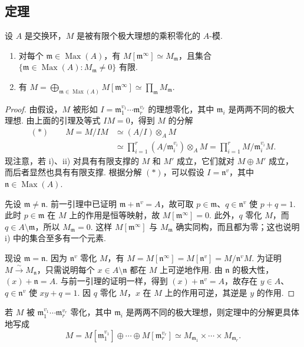 \subsection{定理}\label{sec:galois-1-9-2}
\begin{theorem*}
设 $A$ 是交换环，$M$ 是被有限个极大理想的乘积零化的 $A$-模.
\begin{enumerate}[label=\roman*)]
\item 对每个 $\mathfrak m\in\operatorname{Max}(A)$，有 $M[\mathfrak m^\infty]\simeq M_{\mathfrak m}$，且集合 $\{\mathfrak m\in\operatorname{Max}(A):M_{\mathfrak m}\ne0\}$ 有限.
\item 有 $M=\bigoplus_{\mathfrak m\in\operatorname{Max}(A)}M[\mathfrak m^\infty]\simeq\prod_{\mathfrak m}M_{\mathfrak m}$.
\end{enumerate}
\end{theorem*}
\begin{proof}
由假设，$M$ 被形如 $I=\mathfrak m_1^{v_1}\cdots\mathfrak m_r^{v_r}$ 的理想零化，其中 $\mathfrak m_i$ 是两两不同的极大理想. 由上面的引理及等式 $IM=0$，得到 $M$ 的分解
\begin{align*}
(*)\qquad M=M/IM&\simeq(A/I)\otimes_A M\\
&\simeq\prod_{i=1}^r(A/\mathfrak m_i^{v_i})\otimes_A M
=\prod_{i=1}^r M/\mathfrak m_i^{v_i}M.
\end{align*}
现注意，若 i)、ii) 对具有有限支撑的 $M$ 和 $M'$ 成立，它们就对 $M\oplus M'$ 成立，而后者显然也具有有限支撑. 根据分解 $(*)$，可以假设 $I=\mathfrak n^v$，其中 $\mathfrak n\in\operatorname{Max}(A)$.

先设 $\mathfrak m\ne\mathfrak n$. 前一引理中已证明 $\mathfrak m+\mathfrak n^v=A$，故可取 $p\in\mathfrak m$、$q\in\mathfrak n^v$ 使 $p+q=1$. 此时 $p\in\mathfrak m$ 在 $M$ 上的作用是恒等映射，故 $M[\mathfrak m^\infty]=0$. 此外，$q$ 零化 $M$，而 $q\in A\setminus\mathfrak m$，所以 $M_{\mathfrak m}=0$. 这样 $M[\mathfrak m^\infty]$ 与 $M_{\mathfrak m}$ 确实同构，而且都为零；这也说明 i) 中的集合至多有一个元素.

现设 $\mathfrak m=\mathfrak n$. 因为 $\mathfrak n^v$ 零化 $M$，有 $M=M[\mathfrak n^\infty]=M[\mathfrak n^v]=M/\mathfrak n^vM$. 为证明 $M\xrightarrow{\sim}M_{\mathfrak n}$，只需说明每个 $x\in A\setminus\mathfrak n$ 都在 $M$ 上可逆地作用. 由 $\mathfrak n$ 的极大性，$(x)+\mathfrak n=A$. 与前一引理的证明一样，得到 $(x)+\mathfrak n^v=A$，故存在 $y\in A$、$q\in\mathfrak n^v$ 使 $xy+q=1$. 因 $q$ 零化 $M$，$x$ 在 $M$ 上的作用可逆，其逆是 $y$ 的作用.
\end{proof}
\begin{remark*}
若 $M$ 被 $\mathfrak m_1^{v_1}\cdots\mathfrak m_r^{v_r}$ 零化，其中 $\mathfrak m_i$ 是两两不同的极大理想，则定理中的分解更具体地写成
\[M=M[\mathfrak m_1^{v_1}]\oplus\cdots\oplus M[\mathfrak m_r^{v_r}]\simeq M_{\mathfrak m_1}\times\cdots\times M_{\mathfrak m_r}.\]
\end{remark*}
